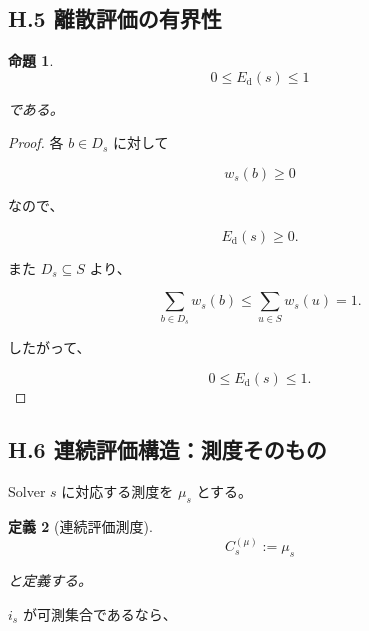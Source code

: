 \documentclass[a4paper,11pt]{article}
\newtheorem{definition}{定義}[section]
\newtheorem{proposition}[definition]{命題}
\begin{document}
\subsection{H.5 離散評価の有界性}

\begin{proposition}
\begin{equation}
    0\leq E_{\mathrm d}(s)\leq1
\end{equation}

である。
\end{proposition}

\begin{proof}
各 $b\in D_s$ に対して

\begin{equation}
    w_s(b)\geq0
\end{equation}

なので、

\begin{equation}
    E_{\mathrm d}(s)\geq0.
\end{equation}

また $D_s\subseteq S$ より、

\begin{equation}
    \sum_{b\in D_s}w_s(b)
    \leq
    \sum_{u\in S}w_s(u)
    =
    1.
\end{equation}

したがって、

\begin{equation}
    0\leq E_{\mathrm d}(s)\leq1.
\end{equation}

\end{proof}


\subsection{H.6 連続評価構造：測度そのもの}

Solver $s$ に対応する測度を $\mu_s$ とする。

\begin{definition}[連続評価測度]
\begin{equation}
    \boxed{
        C_s^{(\mu)}
        :=
        \mu_s
    }
\end{equation}

と定義する。
\end{definition}

$i_s$ が可測集合であるなら、
\end{document}
